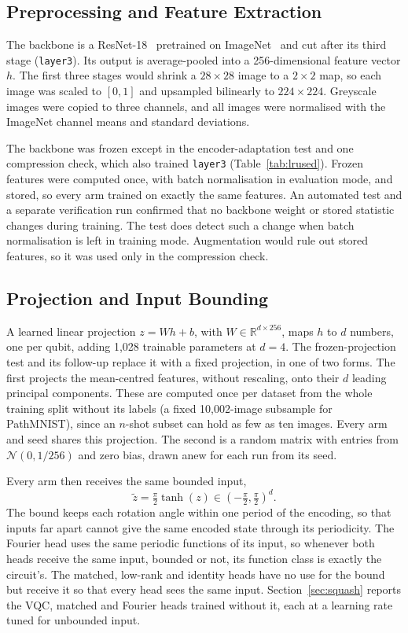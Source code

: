 \documentclass{ieeeaccess}
\newcommand{\vqc}{VQC}
\begin{document}
\subsection{Preprocessing and Feature Extraction}
The backbone is a ResNet-18~\cite{he2016} pretrained on ImageNet~\cite{deng2009} and cut after its third stage (\texttt{layer3}). Its output is average-pooled into a 256-dimensional feature vector $h$. The first three stages would shrink a $28\times28$ image to a $2\times2$ map, so each image was scaled to $[0,1]$ and upsampled bilinearly to $224\times224$. Greyscale images were copied to three channels, and all images were normalised with the ImageNet channel means and standard deviations.

The backbone was frozen except in the encoder-adaptation test and one compression check, which also trained \texttt{layer3} (Table~\ref{tab:lrused}). Frozen features were computed once, with batch normalisation in evaluation mode, and stored, so every arm trained on exactly the same features. An automated test and a separate verification run confirmed that no backbone weight or stored statistic changes during training. The test does detect such a change when batch normalisation is left in training mode. Augmentation would rule out stored features, so it was used only in the compression check.

\subsection{Projection and Input Bounding}
\label{sec:input}
A learned linear projection $z=Wh+b$, with $W\in\mathbb{R}^{d\times256}$, maps $h$ to $d$ numbers, one per qubit, adding 1,028 trainable parameters at $d=4$. The frozen-projection test and its follow-up replace it with a fixed projection, in one of two forms. The first projects the mean-centred features, without rescaling, onto their $d$ leading principal components. These are computed once per dataset from the whole training split without its labels (a fixed 10,002-image subsample for PathMNIST), since an $n$-shot subset can hold as few as ten images. Every arm and seed shares this projection. The second is a random matrix with entries from $\mathcal{N}(0,1/256)$ and zero bias, drawn anew for each run from its seed.

Every arm then receives the same bounded input,
\begin{equation}
\tilde z=\tfrac{\pi}{2}\tanh(z)\in\left(-\tfrac{\pi}{2},\tfrac{\pi}{2}\right)^{d}.
\label{eq:squash}
\end{equation}
The bound keeps each rotation angle within one period of the encoding, so that inputs far apart cannot give the same encoded state through its periodicity. The Fourier head uses the same periodic functions of its input, so whenever both heads receive the same input, bounded or not, its function class is exactly the circuit's. The matched, low-rank and identity heads have no use for the bound but receive it so that every head sees the same input. Section~\ref{sec:squash} reports the \vqc{}, matched and Fourier heads trained without it, each at a learning rate tuned for unbounded input.
\end{document}
